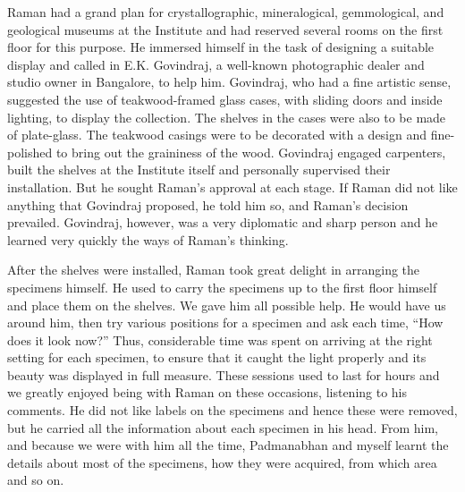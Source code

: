 Raman had a grand plan for crystallographic, mineralogical,
gemmological, and geological museums at the Institute and had
reserved several rooms on the first floor for this purpose.
He immersed himself in the task of designing a suitable display
and called in E.K. Govindraj, a well-known photographic dealer
and studio owner in Bangalore, to help him. Govindraj, who had
a fine artistic sense, suggested the use of teakwood-framed glass
cases, with sliding doors and inside lighting, to display the
collection. The shelves in the cases were also to be made of plate-glass. The teakwood casings were to be decorated with a design
and fine-polished to bring out the graininess of the wood.
Govindraj engaged carpenters, built the shelves at the Institute
itself and personally supervised their installation. But he sought
Raman's approval at each stage. If Raman did not like anything
that Govindraj proposed, he told him so, and Raman's decision
prevailed. Govindraj, however, was a very diplomatic and sharp
person and he learned very quickly the ways of Raman's thinking.

After the shelves were installed, Raman took great delight
in arranging the specimens himself. He used to carry the specimens
up to the first floor himself and place them on the shelves.
We gave him all possible help. He would have us around him,
then try various positions for a specimen and ask each time,
``How does it look now?'' Thus, considerable time was spent on
arriving at the right setting for each specimen, to ensure that it
caught the light properly and its beauty was displayed in full
measure. These sessions used to last for hours and we greatly
enjoyed being with Raman on these occasions, listening to his
comments. He did not like labels on the specimens and hence
these were removed, but he carried all the information about each
specimen in his head. From him, and because we were with
him all the time, Padmanabhan and myself learnt the details
about most of the specimens, how they were acquired, from which
area and so on.

